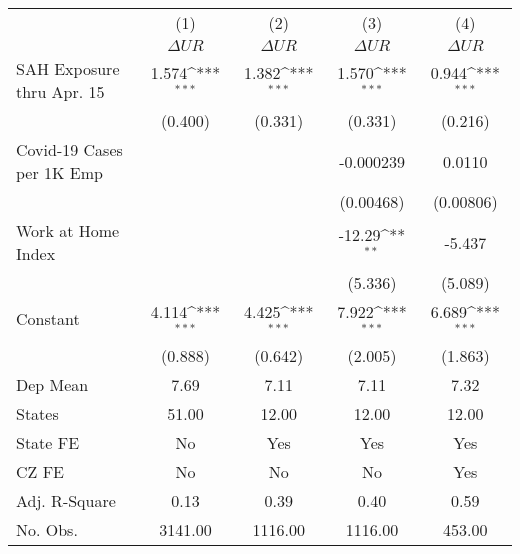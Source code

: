 {
\def\sym#1{\ifmmode^{#1}\else\(^{#1}\)\fi}
\begin{tabular}{l*{4}{c}}
\hline\hline
            &\multicolumn{1}{c}{(1)}         &\multicolumn{1}{c}{(2)}         &\multicolumn{1}{c}{(3)}         &\multicolumn{1}{c}{(4)}         \\
            & $\Delta UR$         & $\Delta UR$         & $\Delta UR$         & $\Delta UR$         \\
\hline
SAH Exposure thru Apr. 15&       1.574\sym{***}&       1.382\sym{***}&       1.570\sym{***}&       0.944\sym{***}\\
            &     (0.400)         &     (0.331)         &     (0.331)         &     (0.216)         \\
Covid-19 Cases per 1K Emp&                     &                     &   -0.000239         &      0.0110         \\
            &                     &                     &   (0.00468)         &   (0.00806)         \\
Work at Home Index&                     &                     &      -12.29\sym{**} &      -5.437         \\
            &                     &                     &     (5.336)         &     (5.089)         \\
Constant    &       4.114\sym{***}&       4.425\sym{***}&       7.922\sym{***}&       6.689\sym{***}\\
            &     (0.888)         &     (0.642)         &     (2.005)         &     (1.863)         \\
\hline
Dep Mean    &        7.69         &        7.11         &        7.11         &        7.32         \\
States      &       51.00         &       12.00         &       12.00         &       12.00         \\
State FE    &          No         &         Yes         &         Yes         &         Yes         \\
CZ FE       &          No         &          No         &          No         &         Yes         \\
Adj. R-Square&        0.13         &        0.39         &        0.40         &        0.59         \\
No. Obs.    &     3141.00         &     1116.00         &     1116.00         &      453.00         \\
\hline\hline
\end{tabular}
}
